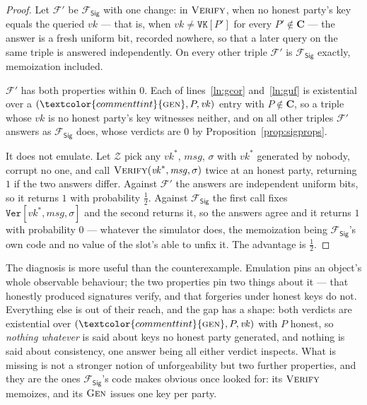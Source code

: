 \documentclass[10pt,oneside,openany]{book}
\newcommand{\Cs}{\mathbf{C}}
\newcommand{\F}{\mathcal{F}}
\newcommand{\Zenv}{\mathcal{Z}}
\newcommand{\op}[1]{\textnormal{\textsc{#1}}}
\newcommand{\atom}[1]{\textcolor{commenttint}{\op{#1}}}
\newcommand{\Fsig}{\mathcal{F}_{\mathsf{Sig}}}
\newcommand{\vk}{\mathit{vk}}
\newcommand{\msg}{\mathit{msg}}
\newcommand{\V}[1]{\mathtt{#1}}
\theoremstyle{accentdef}
\theoremstyle{accentplain}
\begin{document}
\begin{proof}
Let $\F'$ be $\Fsig$ with one change: in $\op{Verify}$, when no honest party's key equals the
queried $\vk$ --- that is, when $\vk \neq \V{VK}[P']$ for every $P' \notin \Cs$ --- the answer is
a fresh uniform bit, recorded nowhere, so that a later query on the same triple is answered
independently. On every other triple $\F'$ is $\Fsig$ exactly, memoization included.

$\F'$ has both properties within $0$. Each of lines~\ref{ln:gcor} and~\ref{ln:guf} is existential
over a $(\atom{gen},P,\vk)$ entry with $P \notin \Cs$, so a triple whose $\vk$ is no honest party's
key witnesses neither, and on all other triples $\F'$ answers as $\Fsig$ does, whose verdicts are
$0$ by Proposition~\ref{prop:sigprops}.

It does not emulate. Let $\Zenv$ pick any $\vk^{*}$, $\msg$, $\sigma$ with $\vk^{*}$ generated by
nobody, corrupt no one, and call $\op{Verify}(\vk^{*},\msg,\sigma)$ twice at an honest party,
returning $1$ if the two answers differ. Against $\F'$ the answers are independent uniform bits,
so it returns $1$ with probability $\tfrac12$. Against $\Fsig$ the first call fixes
$\V{Ver}[\vk^{*},\msg,\sigma]$ and the second returns it, so the answers agree and it returns $1$
with probability $0$ --- whatever the simulator does, the memoization being $\Fsig$'s own code and
no value of the slot's able to unfix it. The advantage is $\tfrac12$.
\end{proof}

The diagnosis is more useful than the counterexample. Emulation pins an object's whole observable
behaviour; the two properties pin two things about it --- that honestly produced signatures verify,
and that forgeries under honest keys do not. Everything else is out of their reach, and the gap
has a shape: both verdicts are existential over $(\atom{gen},P,\vk)$ with $P$ honest, so
\emph{nothing whatever} is said about keys no honest party generated, and nothing is said about
consistency, one answer being all either verdict inspects. What is missing is not a stronger
notion of unforgeability but two further properties, and they are the ones $\Fsig$'s code makes
obvious once looked for: its $\op{Verify}$ memoizes, and its $\op{Gen}$ issues one key per party.
\end{document}

